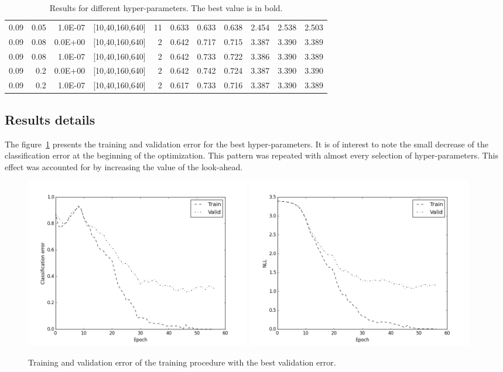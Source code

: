 \begin{table}[f]
\begin{tabular}{@{}rrrrrrrrrrr@{}}
0.09 & 0.05 & 1.0E-07 & {[}10,40,160,640{]} & 11 & 0.633 & 0.633 & 0.638 & 2.454 & 2.538 & 2.503 \\
0.09 & 0.08 & 0.0E+00 & {[}10,40,160,640{]} & 2 & 0.642 & 0.717 & 0.715 & 3.387 & 3.390 & 3.389 \\
0.09 & 0.08 & 1.0E-07 & {[}10,40,160,640{]} & 2 & 0.642 & 0.733 & 0.722 & 3.386 & 3.390 & 3.389 \\
0.09 & 0.2 & 0.0E+00 & {[}10,40,160,640{]} & 2 & 0.642 & 0.742 & 0.724 & 3.387 & 3.390 & 3.390 \\
0.09 & 0.2 & 1.0E-07 & {[}10,40,160,640{]} & 2 & 0.617 & 0.733 & 0.716 & 3.387 & 3.390 & 3.389 \\ \bottomrule
\end{tabular}
\caption{Results for different hyper-parameters. The best value is in bold.}
\end{table}

\subsection{Results details}
The figure~\ref{fig:results_bestrun} presents the training and validation error for the best hyper-parameters. It is of interest to note the small decrease of the classification error at the beginning of the optimization. This pattern was repeated with almost every selection of hyper-parameters. This effect was accounted for by increasing the value of the look-ahead.


\begin{figure}[htbf]
\label{fig:results_bestrun}
\includegraphics[width=0.48\textwidth]{result1.png} 
\includegraphics[width=0.48\textwidth]{result2.png} 
\caption{Training and validation error of the training procedure with the best validation error.}
\end{figure}

